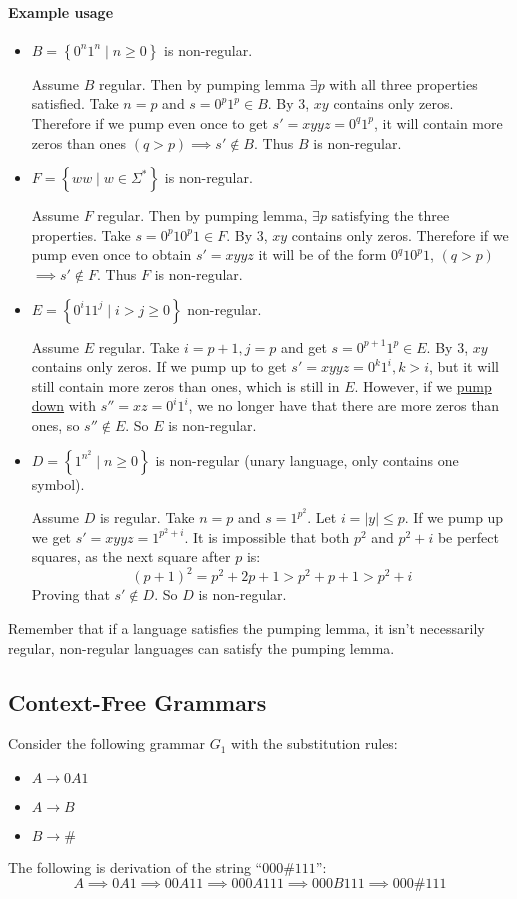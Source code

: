 \documentclass[12 pt]{article}
\begin{document}
\paragraph{Example usage}
\begin{itemize}
\item
$B = \left\{0^n1^n \mid n \geq 0\right\}$ is non-regular.

Assume $B$ regular. Then by pumping lemma $\exists p$ with all three
properties satisfied. Take $n = p$ and $s = 0^p1^p \in B$. By 3, $xy$
contains only zeros. Therefore if we pump even once to get $s' = xyyz
= 0^q1^p$, it will contain more zeros than ones $(q > p) \implies s'
\notin B$. Thus $B$ is non-regular.
\item $F = \left\{ww \mid w \in \Sigma^*\right\}$ is non-regular.

  Assume $F$ regular. Then by pumping lemma, $\exists p$ satisfying
  the three properties. Take $s=0^p10^p1 \in F$. By 3, $xy$ contains
  only zeros. Therefore if we pump even once to obtain $s' = xyyz$ it
  will be of the form $0^q10^p1$, $(q > p)$ $\implies s' \notin F$. Thus $F$
  is non-regular.
\item $E = \left\{0^i11^j \mid i > j \geq 0\right\}$ non-regular.

  Assume $E$ regular. Take $i = p+1, j = p$ and get $s = 0^{p+1}1^p
  \in E$. By 3, $xy$ contains only zeros. If we pump up to get
  $s'=xyyz = 0^k1^i, k > i$, but it will still contain more zeros than
  ones, which is still in $E$. However, if we \underline{pump down} with $s'' = xz
  = 0^i1^i$, we no longer have that there are more zeros than ones, so
  $s'' \notin E$. So $E$ is non-regular.
\item $D = \left\{1^{n^2} \mid n \geq 0\right\}$ is non-regular (unary
  language, only contains one symbol).

  Assume $D$ is regular. Take $n = p$ and $s = 1^{p^2}$. Let $i = |y|
  \leq p$. If we pump up we get $s' = xyyz = 1^{p^2 + i}$. It is
  impossible that both $p^2$ and $p^2 + i$ be perfect squares, as the
  next square after $p$ is:
  $$(p + 1)^2 = p^2 + 2p + 1 > p^2 + p + 1 > p^2 + i$$
  Proving that $s' \notin D$. So $D$ is non-regular.
\end{itemize}
Remember that if a language satisfies the pumping lemma, it isn't
necessarily regular, non-regular languages can satisfy the pumping
lemma.
\subsection{Context-Free Grammars}
Consider the following grammar $G_1$ with the substitution rules:
\begin{itemize}
\item $A \to 0A1$
\item $A \to B$
\item $B \to \#$
\end{itemize}
The following is derivation of the string ``$000\#111$'':
$$A \implies 0A1 \implies 00A11 \implies 000A111 \implies 000B111
\implies 000\# 111$$
\end{document}
